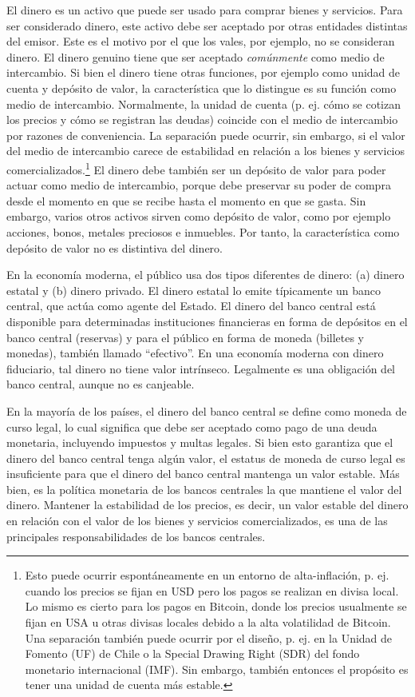 \documentclass[a4paper,10pt]{article} %
\begin{document}
El dinero es un activo que puede ser usado para comprar bienes y
servicios. Para ser considerado dinero, este activo debe ser aceptado
por otras entidades distintas del emisor. Este es el motivo por el que
los vales, por ejemplo, no se consideran dinero. El dinero genuino tiene
que ser aceptado \emph{comúnmente} como medio de intercambio. Si bien el
dinero tiene otras funciones, por ejemplo como unidad de cuenta y
depósito de valor, la característica que lo distingue es su función como
medio de intercambio. Normalmente, la unidad de cuenta (p. ej. cómo se
cotizan los precios y cómo se registran las deudas) coincide con el
medio de intercambio por razones de conveniencia. La separación puede
ocurrir, sin embargo, si el valor del medio de intercambio carece de
estabilidad en relación a los bienes y servicios
comercializados.\footnote{Esto puede ocurrir espontáneamente en un entorno
de alta-inflación, p. ej. cuando los precios se fijan en USD pero los pagos
se realizan en divisa local. Lo mismo es cierto para los pagos en Bitcoin,
donde los precios usualmente se fijan en USA u otras divisas locales debido a
la alta volatilidad de Bitcoin. Una separación también puede ocurrir por el
diseño, p. ej. en la Unidad de Fomento (UF) de Chile o la Special Drawing Right
(SDR) del fondo monetario internacional (IMF). Sin embargo, también entonces el
propósito es tener una unidad de cuenta más estable.} El dinero debe también ser
un depósito de valor para poder actuar como medio de intercambio, porque
debe preservar su poder de compra desde el momento en que se recibe
hasta el momento en que se gasta. Sin embargo, varios otros activos
sirven como depósito de valor, como por ejemplo acciones, bonos, metales
preciosos e inmuebles. Por tanto, la característica como depósito de
valor no es distintiva del dinero.

En la economía moderna, el público usa dos tipos diferentes de dinero:
(a) dinero estatal y (b) dinero privado. El dinero estatal lo emite
típicamente un banco central, que actúa como agente del Estado. El
dinero del banco central está disponible para determinadas instituciones
financieras en forma de depósitos en el banco central (reservas) y para
el público en forma de moneda (billetes y monedas), también llamado
``efectivo''. En una economía moderna con dinero fiduciario, tal dinero
no tiene valor intrínseco. Legalmente es una obligación del banco
central, aunque no es canjeable.

En la mayoría de los países, el dinero del banco central se define como
moneda de curso legal, lo cual significa que debe ser aceptado como pago
de una deuda monetaria, incluyendo impuestos y multas legales. Si bien
esto garantiza que el dinero del banco central tenga algún valor, el
estatus de moneda de curso legal es insuficiente para que el dinero del
banco central mantenga un valor estable. Más bien, es la política
monetaria de los bancos centrales la que mantiene el valor del dinero.
Mantener la estabilidad de los precios, es decir, un valor estable del
dinero en relación con el valor de los bienes y servicios
comercializados, es una de las principales responsabilidades de los
bancos centrales.
\end{document}
